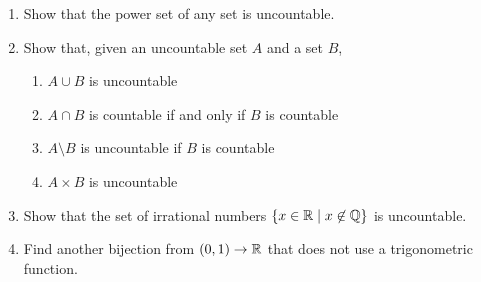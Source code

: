 \documentclass[main.tex]{subfiles}
\begin{document}
\begin{enumerate}
	\item Show that the power set of any set is uncountable.
	\item Show that, given an uncountable set \(A\) and a set \(B\),
	\begin{enumerate}
		\item \(A \cup B\) is uncountable
		\item \(A \cap B\) is countable if and only if \(B\) is countable
		\item \(A \setminus B\) is uncountable if \(B\) is countable
		\item \(A \times B\) is uncountable
	\end{enumerate}
	\item Show that the set of irrational numbers \(\{ x \in \mathbb{R} \mid x \not\in \mathbb{Q} \}\) is uncountable.
	\item Find another bijection from \((0,1) \rightarrow \mathbb{R}\) that does not use a trigonometric function.
\end{enumerate}
\end{document}
